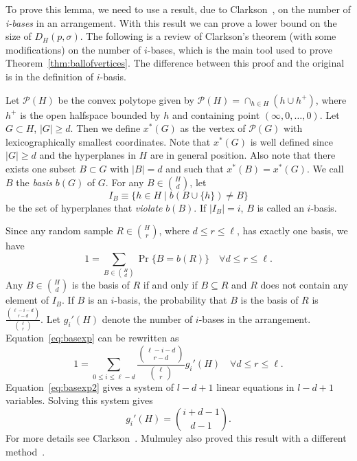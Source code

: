 \documentclass[preprint, 12pt]{elsarticle}
\begin{document}
To prove this lemma, we need to use a result, due to Clarkson~\cite{Clarkson93}, on the number of \emph{i-bases} in an arrangement. With this result we can prove a lower bound on the size of $D_{H}(p,\sigma)$. The following is a review of Clarkson's theorem (with some modifications) on the number of $i$-bases, which is the main tool used to prove Theorem~\ref{thm:ballofvertices}. The difference between this proof and the original is in the definition of $i$-basis.

Let $\mathcal{P}(H)$ be the convex polytope given by $\mathcal{P}(H) = \cap_{h \in H}(h \cup h^{+})$, where $h^{+}$ is the open halfspace bounded by $h$ and containing point $(\infty, 0, \ldots, 0)$. Let $G \subset H$, $|G| \geq d$. Then we define $x^{*}(G)$ as the vertex of $\mathcal{P}(G)$ with lexicographically smallest coordinates. Note that $x^{*}(G)$ is well defined since $|G| \geq d$ and the hyperplanes in $H$ are in general position. Also note that there exists one subset $B \subset G$ with $|B| = d$ and such that $x^{*}(B) = x^{*}(G)$. We call $B$ the \emph{basis} $b(G)$ of $G$. For any $B \in \binom{H}{d}$, let
 \[I_{B} \equiv \{h \in H \mid b(B \cup \{h\}) \neq B\} \]
be the set of hyperplanes that \emph{violate} $b(B)$. If $|I_{B}| = i$, $B$ is called an $i$-basis.

Since any random sample $R \in \binom{H}{r}$, where $d \leq r \leq \ell$, has exactly one basis, we have
\begin{equation}
  \label{eq:basexp}
  1 = \sum_{B \in \binom{H}{d}} \Pr\{ B = b(R)\} \quad \forall d \leq r \leq \ell .
\end{equation}
 Any $B \in \binom{H}{d}$ is the basis of $R$ if and only if $B \subseteq R$ and $R$ does not contain any element of $I_{B}$. If $B$ is an $i$-basis, the probability that $B$ is the basis of $R$ is $\frac{\binom{\ell-i-d}{r-d}}{\binom{\ell}{r}}$. Let $g_{i}'(H)$ denote the number of $i$-bases in the arrangement. Equation~\eqref{eq:basexp} can be rewritten as
 \begin{equation}
   \label{eq:basexp2}
   1 = \sum_{0 \leq i \leq \ell-d}\frac{\binom{\ell-i-d}{r-d}}{\binom{\ell}{r}}g_{i}'(H) \quad \forall d \leq r \leq \ell .
 \end{equation}
Equation~\eqref{eq:basexp2} gives a system of $l - d + 1$ linear equations in $l - d + 1$ variables. Solving this system gives
\begin{equation}
  \label{eq:numibasis}
  g_{i}'(H) = \binom{i+d-1}{d-1}.
\end{equation}
For more details see Clarkson~\cite{Clarkson93}. Mulmuley also proved this result with a different method~\cite{Mulmuley93}.
\end{document}
